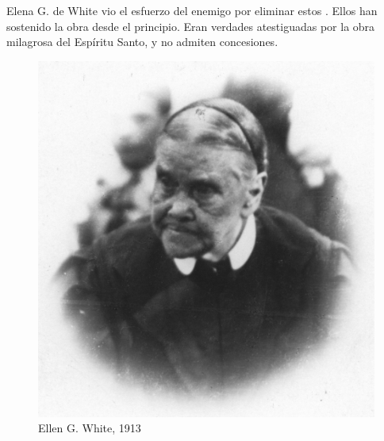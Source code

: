 Elena G. de White vio el esfuerzo del enemigo por eliminar estos . Ellos han sostenido la obra desde el principio. Eran verdades atestiguadas por la obra milagrosa del Espíritu Santo, y no admiten concesiones. 


\begin{figure}
    \centering
    \includegraphics[width=1\linewidth]{images/ellen-white-1913.jpg}
    \caption*{Ellen G. White, 1913}
    \label{fig:e-white-1913}
\end{figure}



